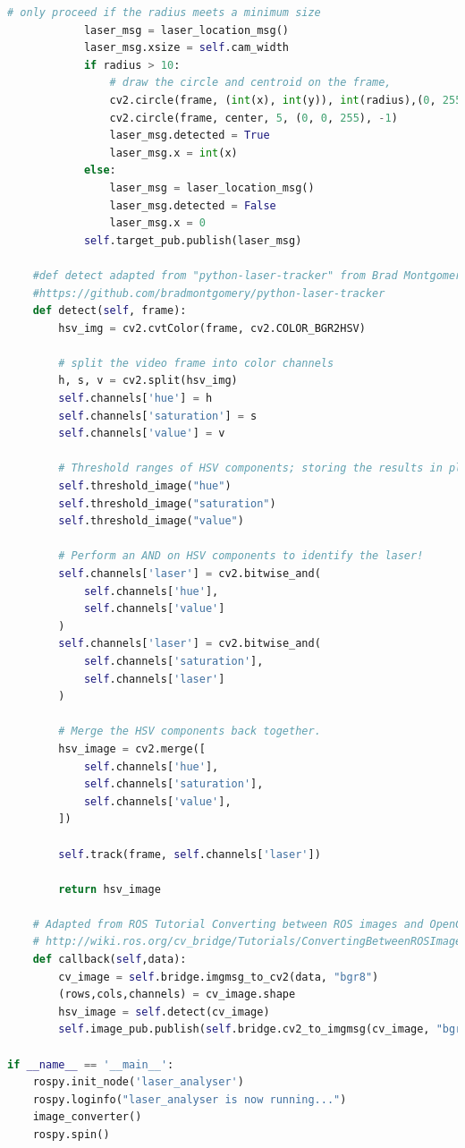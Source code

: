 \documentclass{article}
\begin{document}
\begin{appendices}
\begin{lstlisting}[language=Python]
            # only proceed if the radius meets a minimum size
            laser_msg = laser_location_msg()
            laser_msg.xsize = self.cam_width
            if radius > 10:
                # draw the circle and centroid on the frame,
                cv2.circle(frame, (int(x), int(y)), int(radius),(0, 255, 255), 2)
                cv2.circle(frame, center, 5, (0, 0, 255), -1)
                laser_msg.detected = True              
                laser_msg.x = int(x)
            else:
                laser_msg = laser_location_msg()                    
                laser_msg.detected = False
                laser_msg.x = 0
            self.target_pub.publish(laser_msg)

    #def detect adapted from "python-laser-tracker" from Brad Montgomery, Aug 2016
    #https://github.com/bradmontgomery/python-laser-tracker
    def detect(self, frame):
        hsv_img = cv2.cvtColor(frame, cv2.COLOR_BGR2HSV)

        # split the video frame into color channels
        h, s, v = cv2.split(hsv_img)
        self.channels['hue'] = h
        self.channels['saturation'] = s
        self.channels['value'] = v

        # Threshold ranges of HSV components; storing the results in place
        self.threshold_image("hue")
        self.threshold_image("saturation")
        self.threshold_image("value")

        # Perform an AND on HSV components to identify the laser!
        self.channels['laser'] = cv2.bitwise_and(
            self.channels['hue'],
            self.channels['value']
        )
        self.channels['laser'] = cv2.bitwise_and(
            self.channels['saturation'],
            self.channels['laser']
        )

        # Merge the HSV components back together.
        hsv_image = cv2.merge([
            self.channels['hue'],
            self.channels['saturation'],
            self.channels['value'],
        ])

        self.track(frame, self.channels['laser'])

        return hsv_image  
    
    # Adapted from ROS Tutorial Converting between ROS images and OpenCV images (Python)
    # http://wiki.ros.org/cv_bridge/Tutorials/ConvertingBetweenROSImagesAndOpenCVImagesPython
    def callback(self,data):
        cv_image = self.bridge.imgmsg_to_cv2(data, "bgr8")
        (rows,cols,channels) = cv_image.shape    
        hsv_image = self.detect(cv_image)
        self.image_pub.publish(self.bridge.cv2_to_imgmsg(cv_image, "bgr8"))

if __name__ == '__main__':
    rospy.init_node('laser_analyser')
    rospy.loginfo("laser_analyser is now running...")
    image_converter()  
    rospy.spin() 
\end{lstlisting}

\end{appendices}
\end{document}
